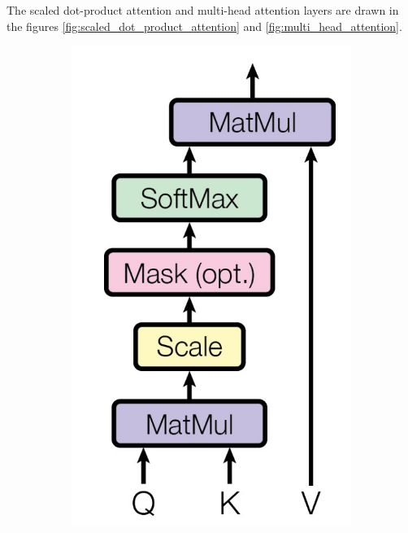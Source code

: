 \documentclass[12pt]{report}
\begin{document}
The scaled dot-product attention and multi-head attention layers are drawn in the figures \ref{fig:scaled_dot_product_attention} and \ref{fig:multi_head_attention}.

\begin{figure}[htbp]
    \centering
    \newlength{\MyOtherHeightFour}
    \begin{subfigure}[t]{0.49\textwidth}
        \centering
        \includegraphics[width=.6\textwidth]{images/related_works/transformer/scaled_dot_product_attention.jpg}

\end{subfigure}
\end{figure}
\end{document}
